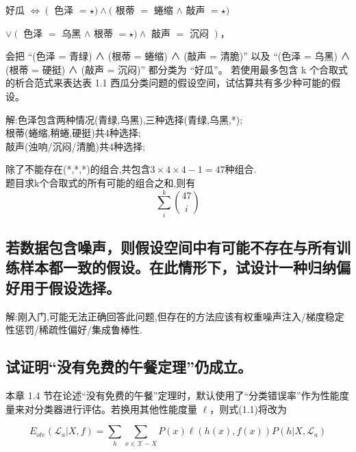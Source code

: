 好瓜 $\Leftrightarrow\left(\right.$ \textnormal{色泽} $=\star)\wedge($ \textnormal{根蒂} $=$ \textnormal{蜷缩} $\wedge$ \textnormal{敲声} $=\star)$

$\vee\left(\right.$ \textnormal{色泽} $=$ \textnormal{乌黑} $\wedge$\textnormal{ 根蒂} $=\star) \wedge$ \textnormal{敲声} $=$ \textnormal{沉闷} $\left.\right)$，

会把 “(色泽 = 青绿) ∧ (根蒂 = 蜷缩) ∧ (敲声 = 清脆)” 以及 “(色泽 = 乌黑) ∧ (根蒂 = 硬挺) ∧ (敲声 = 沉闷)” 都分类为 “好瓜”。
若使用最多包含 k 个合取式的析合范式来表达表 1.1 西瓜分类问题的假设空间，试估算共有多少种可能的假设。

解:色泽包含两种情况(青绿,乌黑),三种选择(青绿,乌黑,*);\\ 根蒂(蜷缩,稍蜷,硬挺)共4种选择;\\ 敲声(浊响/沉闷/清脆)共4种选择;
\par 除了不能存在(*,*,*)的组合,共包含$ 3 \times 4 \times 4 -1 = 47$种组合.\\ 题目求k个合取式的所有可能的组合之和,则有
\begin{equation}
    \boxed{\sum_{i}^{k} \binom{47}{i}}
\end{equation}
\subsection{若数据包含噪声，则假设空间中有可能不存在与所有训练样本都一致的假设。在此情形下，试设计一种归纳偏好用于假设选择。}
解:刚入门,可能无法正确回答此问题,但存在的方法应该有权重噪声注入/梯度稳定性惩罚/稀疏性偏好/集成鲁棒性.

\subsection{试证明“没有免费的午餐定理”仍成立。}
本章 1.4 节在论述“没有免费的午餐”定理时，默认使用了“分类错误率”作为性能度量来对分类器进行评估。若换用其他性能度量 \( \ell \)，则式(1.1)将改为

\[ E_{ote}(\mathcal{L}_a | X, f) = \sum_h \sum_{x \in \mathcal{X} - X} P(x) \ell(h(x), f(x)) P(h | X, \mathcal{L}_a) \]

